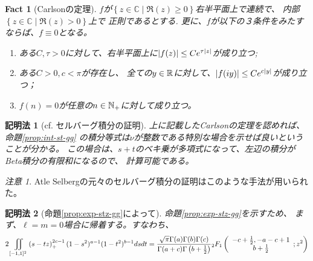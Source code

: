 \documentclass[12pt,a4paper,dvipdfmx]{jsarticle}
\numberwithin{equation}{section}
\theoremstyle{jplain}
\newtheorem{method}{記明法}
\newtheorem{fact}[thm]{Fact}
\theoremstyle{remark}
\newtheorem*{remark*}{注意}
\theoremstyle{definition}
\begin{document}
{\begin{fact}[Carlsonの定理]
	$f$が$\left\{ z\in\mathbb{C}\mid \Re(z)\ge0 \right\}$右半平面上で連続で、
	内部$\left\{ z\in\mathbb{C}\mid\Re(z)>0 \right\}$上で
	正則であるとする.
	更に、$f$が以下の３条件をみたすならば、$f\equiv0$となる。
	\begin{enumerate}
		\item ある$C,\tau>0$に対して、右半平面上に$\left|f(z)\right|\le C e^{\tau\left|z\right|}$が成り立つ;
		\item ある$ C>0,c<\pi$が存在し、
			全ての$y\in\mathbb{R}$に対して、$\left|f(iy)\right|\le Ce^{c\left|y\right|}$が成り立つ；
		\item $f(n)=0$が任意の$n\in\mathbb{N}_+$に対して成り立つ。
	\end{enumerate}
\end{fact}
\begin{method}[cf. セルバーグ積分の証明]
	上に記載したCarlsonの定理を認めれば、
	命題\ref{prop:int-st-gg}
	の積分等式は$\nu$が整数である特別な場合を示せば良いということが分かる。
この場合は、$s+t$のベキ乗が多項式になって、左辺の積分がBeta積分の有限和になるので、
計算可能である。
\end{method}
\begin{remark*}
	Atle Selbergの元々のセルバーグ積分の証明\cite{Selberg:411367}はこのような手法が用いられ{た}。
\end{remark*}
\begin{method}[命題\ref{prop:exp-stz-gg}によって]
	命題\ref{prop:exp-stz-gg}を示すため、
	まず、$\ell=m=0$場合に帰着する。すなわち、
			\begin{equation}
				2\iint\displaylimits_{[-1,1]^2} \left( s-tz \right)_+^{2c-1}  (1 - s^2)^{a - 1} (1 -
				t^2)^{b - 1} d s d t
				=
				\frac{\sqrt{\pi} \Gamma (a) \Gamma (b) \Gamma
			(c)}{\Gamma (a + c) \Gamma \left( b + \frac{1}{2} \right)} {}_2 F_1 \left(
			\begin{array}{c}
				  - c + \frac{1}{2}, - a - c + 1\\
				    b + \frac{1}{2}
			    \end{array} ; z^2 \right)
				\label{eqn:prop21}
			\end{equation}

\end{method}}
\end{document}
